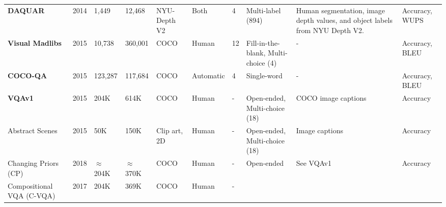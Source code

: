 \begin{landscape}
\begin{footnotesize}
\begin{center}
\begin{longtable}[c]{llllllllll}
          \textbf{DAQUAR} \cite{malinowski2014multiworld}
          & 2014
          & 1,449  %
          & 12,468  %
          & NYU-Depth V2 \cite{silberman2012indoor}
          & Both
          & 4
          & Multi-label (894)
          & Human segmentation, image depth values, and object labels from NYU Depth V2.
          & Accuracy, WUPS \\
          \textbf{Visual Madlibs} \cite{yu2015visual}
          & 2015
          & 10,738  %
          & 360,001  %
          & COCO \cite{lin2014microsoft}
          & Human
          & 12
          & Fill-in-the-blank, Multi-choice (4)
          & -
          & Accuracy, BLEU \\
          \textbf{COCO-QA}
          & 2015
          & 123,287
          & 117,684
          & COCO
          & Automatic
          & 4
          & Single-word
          & -
          & Accuracy, BLEU \\
          \textbf{VQAv1} \cite{antol2015vqa}
          & 2015
          & 204K  %
          & 614K  %
          & COCO
          & Human
          & -
          & Open-ended, Multi-choice (18)
          & COCO image captions
          & Accuracy\footnotemark \\
          Abstract Scenes
          & 2015
          & 50K  %
          & 150K  %
          & Clip art, 2D
          & Human
          & -
          & Open-ended, Multi-choice (18)
          & Image captions
          & Accuracy\footnotemark[\value{footnote}] \\
          Changing Priors (CP) \cite{agrawal2018dont}
          & 2018
          & {\color{red}\(\approx\)204K}  %
          & {\color{red}\(\approx\)370K}  %
          & COCO
          & Human
          & -
          & Open-ended
          & See VQAv1
          & Accuracy\footnotemark[\value{footnote}] \\
          Compositional VQA (C-VQA) \cite{agrawal2017cvqa}
          & 2017
          & 204K  %
          & 369K  %
          & COCO
          & Human
          & -

\end{longtable}
\end{center}
\end{footnotesize}
\end{landscape}
